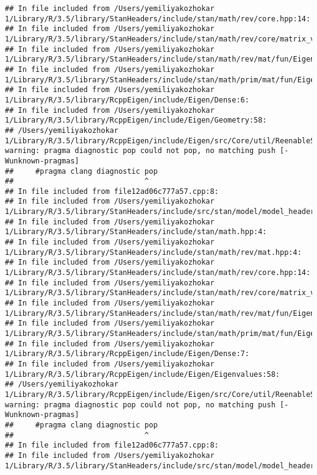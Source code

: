 \documentclass[]{article}
\begin{document}
\begin{verbatim}
## In file included from /Users/yemiliyakozhokar 1/Library/R/3.5/library/StanHeaders/include/stan/math/rev/core.hpp:14:
## In file included from /Users/yemiliyakozhokar 1/Library/R/3.5/library/StanHeaders/include/stan/math/rev/core/matrix_vari.hpp:4:
## In file included from /Users/yemiliyakozhokar 1/Library/R/3.5/library/StanHeaders/include/stan/math/rev/mat/fun/Eigen_NumTraits.hpp:4:
## In file included from /Users/yemiliyakozhokar 1/Library/R/3.5/library/StanHeaders/include/stan/math/prim/mat/fun/Eigen.hpp:4:
## In file included from /Users/yemiliyakozhokar 1/Library/R/3.5/library/RcppEigen/include/Eigen/Dense:6:
## In file included from /Users/yemiliyakozhokar 1/Library/R/3.5/library/RcppEigen/include/Eigen/Geometry:58:
## /Users/yemiliyakozhokar 1/Library/R/3.5/library/RcppEigen/include/Eigen/src/Core/util/ReenableStupidWarnings.h:10:30: warning: pragma diagnostic pop could not pop, no matching push [-Wunknown-pragmas]
##     #pragma clang diagnostic pop
##                              ^
## In file included from file12ad06c777a57.cpp:8:
## In file included from /Users/yemiliyakozhokar 1/Library/R/3.5/library/StanHeaders/include/src/stan/model/model_header.hpp:4:
## In file included from /Users/yemiliyakozhokar 1/Library/R/3.5/library/StanHeaders/include/stan/math.hpp:4:
## In file included from /Users/yemiliyakozhokar 1/Library/R/3.5/library/StanHeaders/include/stan/math/rev/mat.hpp:4:
## In file included from /Users/yemiliyakozhokar 1/Library/R/3.5/library/StanHeaders/include/stan/math/rev/core.hpp:14:
## In file included from /Users/yemiliyakozhokar 1/Library/R/3.5/library/StanHeaders/include/stan/math/rev/core/matrix_vari.hpp:4:
## In file included from /Users/yemiliyakozhokar 1/Library/R/3.5/library/StanHeaders/include/stan/math/rev/mat/fun/Eigen_NumTraits.hpp:4:
## In file included from /Users/yemiliyakozhokar 1/Library/R/3.5/library/StanHeaders/include/stan/math/prim/mat/fun/Eigen.hpp:4:
## In file included from /Users/yemiliyakozhokar 1/Library/R/3.5/library/RcppEigen/include/Eigen/Dense:7:
## In file included from /Users/yemiliyakozhokar 1/Library/R/3.5/library/RcppEigen/include/Eigen/Eigenvalues:58:
## /Users/yemiliyakozhokar 1/Library/R/3.5/library/RcppEigen/include/Eigen/src/Core/util/ReenableStupidWarnings.h:10:30: warning: pragma diagnostic pop could not pop, no matching push [-Wunknown-pragmas]
##     #pragma clang diagnostic pop
##                              ^
## In file included from file12ad06c777a57.cpp:8:
## In file included from /Users/yemiliyakozhokar 1/Library/R/3.5/library/StanHeaders/include/src/stan/model/model_header.hpp:4:

\end{verbatim}
\end{document}
